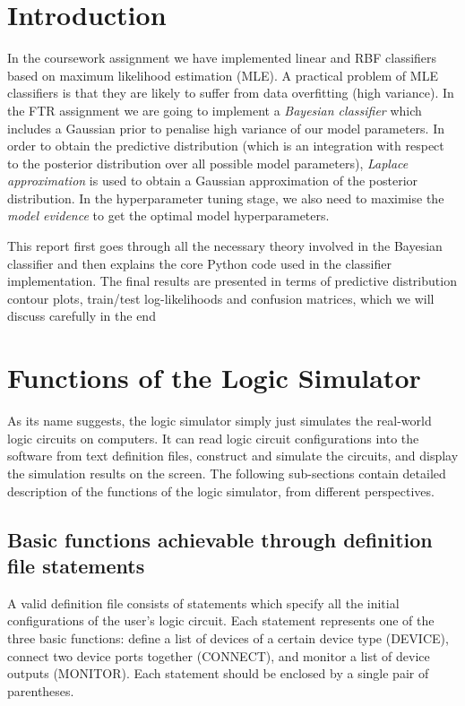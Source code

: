\documentclass[10pt,a4paper]{article}
\author{Yuchen Zhou}
\date{\today}
\title{}
\begin{document}


\section{Introduction}
\label{sec:org4fc4869}

In the coursework assignment we have implemented linear and RBF
classifiers based on maximum likelihood estimation (MLE). A practical
problem of MLE classifiers is that they are likely to suffer from data
overfitting (high variance). In the FTR assignment we are going to
implement a \emph{Bayesian classifier} which includes a Gaussian prior to
penalise high variance of our model parameters. In order to obtain the
predictive distribution (which is an integration with respect to the
posterior distribution over all possible model parameters), \emph{Laplace
approximation} is used to obtain a Gaussian approximation of the
posterior distribution. In the hyperparameter tuning stage, we also
need to maximise the \emph{model evidence} to get the optimal model
hyperparameters. 

This report first goes through all the necessary theory involved in
the Bayesian classifier and then explains the core Python code used in
the classifier implementation. The final results are presented in
terms of predictive distribution contour plots, train/test
log-likelihoods and confusion matrices, which we will discuss
carefully in the end

\section{Functions of the Logic Simulator}
\label{sec:org6ac67bb}

As its name suggests, the logic simulator simply just simulates the
real-world logic circuits on computers. It can read logic circuit
configurations into the software from text definition files, construct
and simulate the circuits, and display the simulation results on the
screen. The following sub-sections contain detailed description of the
functions of the logic simulator, from different perspectives.

\subsection{Basic functions achievable through definition file statements}
\label{sec:orga772621}
\label{orgb2fd366}

A valid definition file consists of statements which specify all the
initial configurations of the user's logic circuit. Each statement
represents one of the three basic functions: define a list of devices
of a certain device type (DEVICE), connect two device ports together
(CONNECT), and monitor a list of device outputs (MONITOR). Each
statement should be enclosed by a single pair of parentheses.
\end{document}
